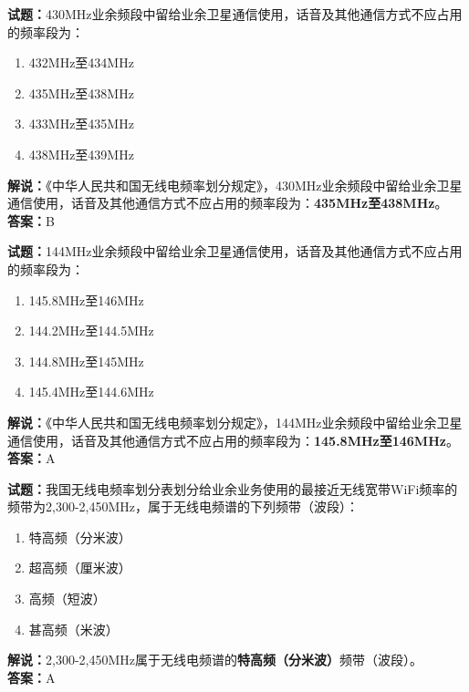 \documentclass{ctexbook}
\begin{document}
\bigskip

\noindent\textbf{试题：}430\unit{\MHz}业余频段中留给业余卫星通信使用，话音及其他通信方式不应占用的频率段为：
\begin{enumerate}[leftmargin=3em]
  \item 432\unit{\MHz}至434\unit{\MHz}
  \item 435\unit{\MHz}至438\unit{\MHz}
  \item 433\unit{\MHz}至435\unit{\MHz}
  \item 438\unit{\MHz}至439\unit{\MHz}
\end{enumerate}
\noindent\textbf{解说：}《中华人民共和国无线电频率划分规定》，430\unit{\MHz}业余频段中留给业余卫星通信使用，话音及其他通信方式不应占用的频率段为：\textbf{435\unit{\MHz}至438\unit{\MHz}}。\\\noindent\textbf{答案：}B

\bigskip

\noindent\textbf{试题：}144\unit{\MHz}业余频段中留给业余卫星通信使用，话音及其他通信方式不应占用的频率段为：
\begin{enumerate}[leftmargin=3em]
  \item 145.8\unit{\MHz}至146\unit{\MHz}
  \item 144.2\unit{\MHz}至144.5\unit{\MHz}
  \item 144.8\unit{\MHz}至145\unit{\MHz}
  \item 145.4\unit{\MHz}至144.6\unit{\MHz}
\end{enumerate}
\noindent\textbf{解说：}《中华人民共和国无线电频率划分规定》，144\unit{\MHz}业余频段中留给业余卫星通信使用，话音及其他通信方式不应占用的频率段为：\textbf{145.8\unit{\MHz}至146\unit{\MHz}}。\\\noindent\textbf{答案：}A

\bigskip

\noindent\textbf{试题：}我国无线电频率划分表划分给业余业务使用的最接近无线宽带WiFi频率的频带为2,300-2,450\unit{\MHz}，属于无线电频谱的下列频带（波段）：
\begin{enumerate}[leftmargin=3em]
  \item 特高频（分米波）
  \item 超高频（厘米波）
  \item 高频（短波）
  \item 甚高频（米波）
\end{enumerate}
\noindent\textbf{解说：}2,300-2,450\unit{\MHz}属于无线电频谱的\textbf{特高频（分米波）}频带（波段）。\\\noindent\textbf{答案：}A
\end{document}
